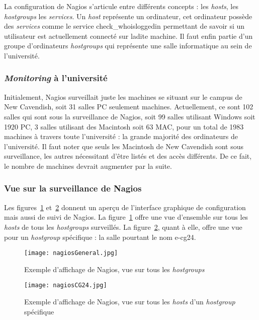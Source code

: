 La configuration de Nagios s'articule entre diff\'erents concepts : les \textit{hosts}, les \textit{hostgroups} les \textit{services}.
Un \textit{host} repr\'esente un ordinateur, cet ordinateur poss\`ede des \textit{services} comme le service \textsf{check\_whoisloggedin} permettant de savoir si un utilisateur est actuellement connect\'e sur ladite machine.
Il faut enfin partie d'un groupe d'ordinateurs \textit{hostgroups} qui repr\'esente une salle informatique au sein de l'universit\'e.

\subsubsection{\og{}\textit{Monitoring}\fg{} \`a l'universit\'e}

Initialement, Nagios surveillait juste les machines se situant sur le campus de New Cavendish, soit 31 salles PC seulement machines.
Actuellement, ce sont 102 salles qui sont sous la surveillance de Nagios, soit 99 salles utilisant Windows soit 1920 PC, 3 salles utilisant des Macintosh soit 63 MAC, pour un total de 1983 machines \`a travers toute l'universit\'e : la grande majorit\'e des ordinateurs de l'universit\'e.
Il faut noter que seuls les Macintosh de New Cavendish sont sous surveillance, les autres n\'ecessitant d'\^etre list\'es et des acc\`es diff\'erents.
De ce fait, le nombre de machines devrait augmenter par la suite.

\subsubsection{Vue sur la surveillance de Nagios}

Les figures~\ref{figure:nagiosGeneral} et~\ref{figure:nagiosCG24}  donnent un aper\c{c}u de l'interface graphique de configuration mais aussi de suivi de Nagios.
La figure~\ref{figure:nagiosGeneral} offre une vue d'ensemble sur tous les  \textit{hosts} de tous les \textit{hostgroups} surveill\'es.
La figure~\ref{figure:nagiosCG24}, quant \`a elle, offre une vue pour un \textit{hostgroup} sp\'ecifique : la salle pourtant le nom \textsf{e-cg24}.

\begin{figure}[!ht]
	\centering
	\texttt{[image: nagiosGeneral.jpg]}
	\caption{Exemple d'affichage de Nagios, vue sur tous les \textit{hostgroups}}
	\label{figure:nagiosGeneral}
	
\end{figure}

\begin{figure}[!ht]
	\centering
	\texttt{[image: nagiosCG24.jpg]}
	\caption{Exemple d'affichage de Nagios, vue sur tous les \textit{hosts} d'un \textit{hostgroup} sp\'ecifique}
	\label{figure:nagiosCG24}
	
\end{figure}

